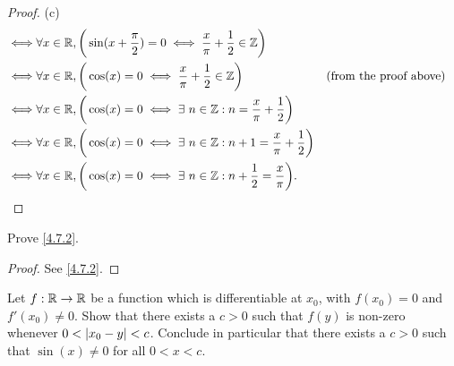 \begin{proof}{(c)}
\begin{align*}
    \iff & \forall x \in \mathbb{R}, \bigg(\sin(x + \dfrac{\pi}{2}) = 0 \iff \dfrac{x}{\pi} + \dfrac{1}{2} \in \mathbb{Z}\bigg)                                        \\
    \iff & \forall x \in \mathbb{R}, \bigg(\cos(x) = 0 \iff \dfrac{x}{\pi} + \dfrac{1}{2} \in \mathbb{Z}\bigg)                      &  & \text{(from the proof above)} \\
    \iff & \forall x \in \mathbb{R}, \bigg(\cos(x) = 0 \iff \exists\ n \in \mathbb{Z} : n = \dfrac{x}{\pi} + \dfrac{1}{2}\bigg)                                        \\
    \iff & \forall x \in \mathbb{R}, \bigg(\cos(x) = 0 \iff \exists\ n \in \mathbb{Z} : n + 1 = \dfrac{x}{\pi} + \dfrac{1}{2}\bigg)                                    \\
    \iff & \forall x \in \mathbb{R}, \bigg(\cos(x) = 0 \iff \exists\ n \in \mathbb{Z} : n + \dfrac{1}{2} = \dfrac{x}{\pi}\bigg).
  \end{align*}
\end{proof}

\exercisesection

\begin{ex}\label{ex:4.7.1}
  Prove \cref{4.7.2}.
\end{ex}

\begin{proof}
  See \cref{4.7.2}.
\end{proof}

\begin{ex}\label{ex:4.7.2}
  Let \(f : \mathbb{R} \to \mathbb{R}\) be a function which is differentiable at \(x_0\), with \(f(x_0) = 0\) and \(f'(x_0) \neq 0\).
  Show that there exists a \(c > 0\) such that \(f(y)\) is non-zero whenever \(0 < \left\lvert x_0 - y\right\rvert < c\).
  Conclude in particular that there exists a \(c > 0\) such that \(\sin(x) \neq 0\) for all \(0 < x < c\).
\end{ex}

